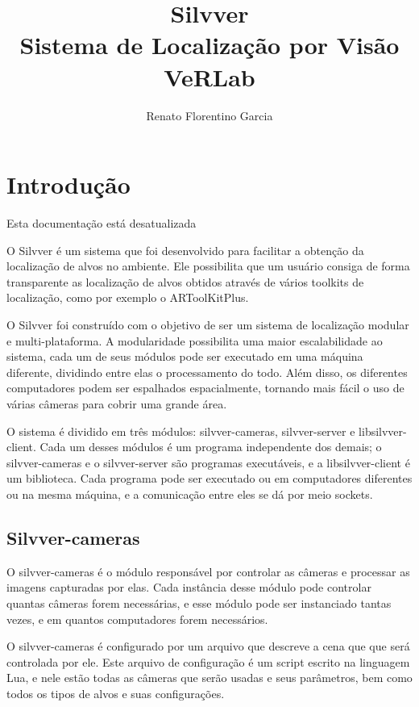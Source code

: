 \documentclass[a4paper,10pt]{article}
\title {Silvver \\ Sistema de Localização por Visão VeRLab}
\author{Renato Florentino Garcia}
\begin{document}
\maketitle
\newpage

\tableofcontents
\newpage
\section{Introdução}
Esta documentação está desatualizada

O Silvver é um sistema que foi desenvolvido para facilitar a obtenção da
localização de alvos no ambiente. Ele possibilita que um usuário consiga de
forma transparente as localização de alvos obtidos através de vários toolkits
de localização, como por exemplo o ARToolKitPlus.

O Silvver foi construído com o objetivo de ser um sistema de localização
modular e multi-plataforma. A modularidade possibilita uma maior
escalabilidade ao sistema, cada um de seus módulos pode ser executado em uma
máquina diferente, dividindo entre elas o processamento do todo. Além disso,
os diferentes computadores podem ser espalhados espacialmente, tornando mais
fácil o uso de várias câmeras para cobrir uma grande área.

O sistema é dividido em três módulos: silvver-cameras, silvver-server e
libsilvver-client. Cada um desses módulos é um programa independente dos
demais; o silvver-cameras e o silvver-server são programas executáveis, e a
libsilvver-client é um biblioteca. Cada programa pode ser executado ou em
computadores diferentes ou na mesma máquina, e a comunicação entre eles se dá
por meio sockets.

\subsection{Silvver-cameras}

O silvver-cameras é o módulo responsável por controlar as câmeras e processar
as imagens capturadas por elas. Cada instância desse módulo pode controlar
quantas câmeras forem necessárias, e esse módulo pode ser instanciado tantas
vezes, e em quantos computadores forem necessários.

O silvver-cameras é configurado por um arquivo que descreve a cena que que
será controlada por ele. Este arquivo de configuração é um script escrito na
linguagem Lua\cite{lua}, e nele estão todas as câmeras que serão usadas e seus
parâmetros, bem como todos os tipos de alvos e suas configurações.
\end{document}
